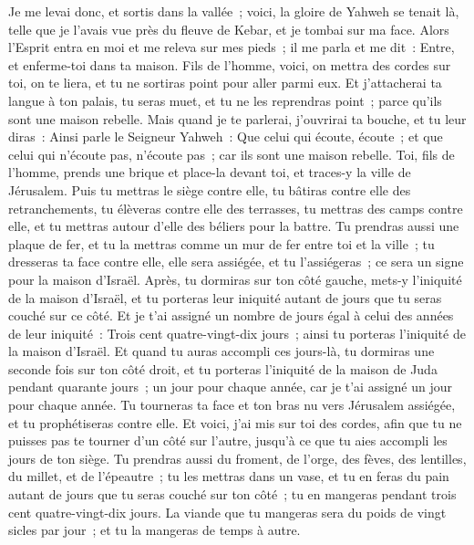 \begin{multicols}{2}
Je me levai donc, et sortis dans la vallée~; voici, la gloire de Yahweh se tenait là, telle que je l'avais vue près du fleuve de Kebar, et je tombai sur ma face.
Alors l'Esprit entra en moi et me releva sur mes pieds~; il me parla et me dit~: Entre, et enferme-toi dans ta maison.
Fils de l'homme, voici, on mettra des cordes sur toi, on te liera, et tu ne sortiras point pour aller parmi eux.
 Et j'attacherai ta langue à ton palais, tu seras muet, et tu ne les reprendras point~; parce qu'ils sont une maison rebelle.
Mais quand je te parlerai, j'ouvrirai ta bouche, et tu leur diras~: Ainsi parle le Seigneur Yahweh~: Que celui qui écoute, écoute~; et que celui qui n'écoute pas, n'écoute pas~; car ils sont une maison rebelle.
\VerseOne{}Toi, fils de l'homme, prends une brique et place-la devant toi, et traces-y la ville de Jérusalem.
Puis tu mettras le siège contre elle, tu bâtiras contre elle des retranchements, tu élèveras contre elle des terrasses, tu mettras des camps contre elle, et tu mettras autour d'elle des béliers pour la battre.
Tu prendras aussi une plaque de fer, et tu la mettras comme un mur de fer entre toi et la ville~; tu dresseras ta face contre elle, elle sera assiégée, et tu l'assiégeras~; ce sera un signe pour la maison d'Israël.
Après, tu dormiras sur ton côté gauche, mets-y l'iniquité de la maison d'Israël, et tu porteras leur iniquité autant de jours que tu seras couché sur ce côté.
Et je t'ai assigné un nombre de jours égal à celui des années de leur iniquité~: Trois cent quatre-vingt-dix jours~; ainsi tu porteras l'iniquité de la maison d'Israël.
Et quand tu auras accompli ces jours-là, tu dormiras une seconde fois sur ton côté droit, et tu porteras l'iniquité de la maison de Juda pendant quarante jours~; un jour pour chaque année, car je t'ai assigné un jour pour chaque année.
Tu tourneras ta face et ton bras nu vers Jérusalem assiégée, et tu prophétiseras contre elle.
Et voici, j'ai mis sur toi des cordes, afin que tu ne puisses pas te tourner d'un côté sur l'autre, jusqu'à ce que tu aies accompli les jours de ton siège.
Tu prendras aussi du froment, de l'orge, des fèves, des lentilles, du millet, et de l'épeautre~; tu les mettras dans un vase, et tu en feras du pain autant de jours que tu seras couché sur ton côté~; tu en mangeras pendant trois cent quatre-vingt-dix jours.
La viande que tu mangeras sera du poids de vingt sicles par jour~; et tu la mangeras de temps à autre.

\end{multicols}
